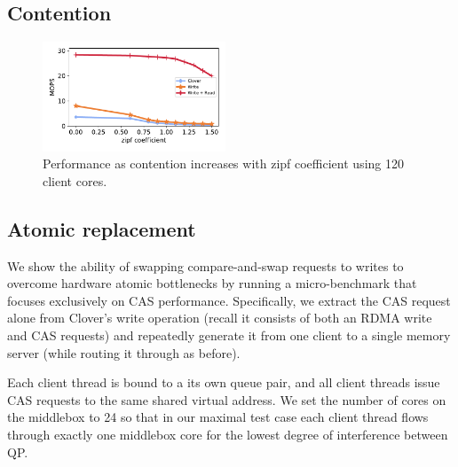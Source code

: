 \subsection{Contention}
\begin{figure}
  \centering
  \includegraphics[width=0.485\textwidth]{fig/contention.pdf}

    \caption{Performance as contention increases with zipf coefficient using 120 client cores.
    }

    \label{fig:packet_size}
\end{figure}




\subsection{Atomic replacement}

We show the ability of swapping compare-and-swap requests to writes
to overcome hardware atomic bottlenecks by running a micro-benchmark
that focuses exclusively on CAS performance.  Specifically, we extract
the CAS request alone from Clover's write operation (recall it
consists of both an RDMA write and CAS requests) and repeatedly generate it
from one client to a single memory server (while routing it through
{\sword} as before).


Each client thread is bound to a its own queue pair, and all client
threads issue CAS requests to the same shared virtual address.  We
set the number of cores on the {\sword} middlebox to 24 so that in our maximal
test case each client thread flows through exactly one middlebox core
for the lowest degree of interference between QP.

